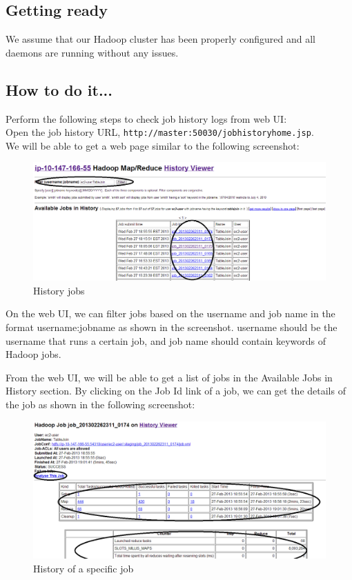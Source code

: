 \subsection*{Getting ready}
We assume that our Hadoop cluster has been properly configured and all daemons are running without any issues.
\subsection*{How to do it...}
Perform the following steps to check job history logs from web UI:\\ 

Open the job history URL, \verb|http://master:50030/jobhistoryhome.jsp|. \\
We will be able to get a web page similar to the following screenshot:
\begin{figure}[h]
  \centering
  \includegraphics[width=\textwidth]{figs/5163OS_04_01.png}
  \caption{History jobs}\label{fig:history.jobs}
\end{figure} 

On the web UI, we can filter jobs based on the username and job name in the format username:jobname as shown in the screenshot. username should be the username that runs a certain job, and job name should contain keywords of Hadoop jobs.

From the web UI, we will be able to get a list of jobs in the Available Jobs in History section. By clicking on the Job Id link of a job, we can get the details of the job as shown in the following screenshot:
\begin{figure}[h]
  \centering
  \includegraphics[width=\textwidth]{figs/5163OS_04_02.png}
  \caption{History of a specific job}\label{fig:specific.job.history}
\end{figure} 

